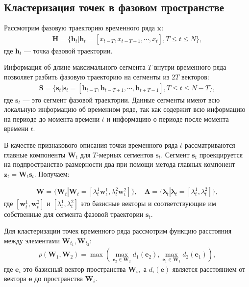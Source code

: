\subsection{Кластеризация точек в фазовом пространстве}
Рассмотрим фазовую траекторию временного ряда $\textbf{x}$:
\[
\label{eq:cl:1}
\begin{aligned}
\mathbf{H} = \{\textbf{h}_t| \textbf{h}_t = [x_{t-T}, x_{t-T+1}, \cdots, x_{t}], T\leq t\leq N\},
\end{aligned}
\]
где $\textbf{h}_t$ --- точка фазовой траектории.

Информация об длине максимального сегмента $T$ внутри временного ряда позволяет разбить фазовую траекторию на сегменты из $2T$ векторов:
\[
\label{eq:cl:2}
\begin{aligned}
\mathbf{S} = \{\textbf{s}_t| \textbf{s}_t = [\textbf{h}_{t-T}, \textbf{h}_{t-T+1}, \cdots, \textbf{h}_{t+T-1}], T\leq t\leq N-T\},
\end{aligned}
\]
где $\textbf{s}_t$ --- это сегмент фазовой траектории. Данные сегменты имеют всю локальную информацию об временном ряде, так как содержит всю информацию на периоде до момента времени $t$ и информацию о периоде после момента времени $t$.

В качестве признакового описания точки временного ряда $t$ рассматриваются главные компоненты $\textbf{W}_t$ для $T\text{-мерных}$ сегментов $\textbf{s}_t$. Сегмент $\textbf{s}_t$ проекцируется на подпространство размерности два при помощи метода главных  компонент $\textbf{z}_t = \textbf{W}_t\textbf{s}_t$. Получаем:

\[
\label{eq:cl:3}
\begin{aligned}
\mathbf{W} = \{\textbf{W}_t| \textbf{W}_t = [\lambda^1_t\textbf{w}^1_t, \lambda^2_t\textbf{w}^2_t]\}, \quad \bm{\Lambda} = \{\bm{\lambda}_t| \bm{\lambda}_t=[\lambda^1_t, \lambda^2_t]\},
\end{aligned}
\]
где $[\textbf{w}^1_t, \textbf{w}^2_t]$ и $[\lambda^1_t, \lambda^2_t]$ это базисные векторы и соответствующие им собственные для сегмента фазовой траектории $\textbf{s}_t$.

Для кластеризации точек временного ряда рассмотрим функцию расстояния между элементами $\mathbf{W}_{t_1},\mathbf{W}_{t_2}$:
\[
\label{eq:cl:4}
\begin{aligned}
\rho\left(\textbf{W}_1, \textbf{W}_2\right) = \max\left(\max_{\textbf{e}_2 \in \textbf{W}_2} d_{1}\left(\textbf{e}_2\right), \max_{\textbf{e}_1 \in \textbf{W}_1} d_{2}\left(\textbf{e}_1\right)\right),
\end{aligned}
\]
где  $\textbf{e}_i$ это базисный вектор пространства $\textbf{W}_i,$ а $d_i\left(\textbf{e}\right)$ является расстоянием от вектора $\textbf{e}$ до пространства $\textbf{W}_i$.

